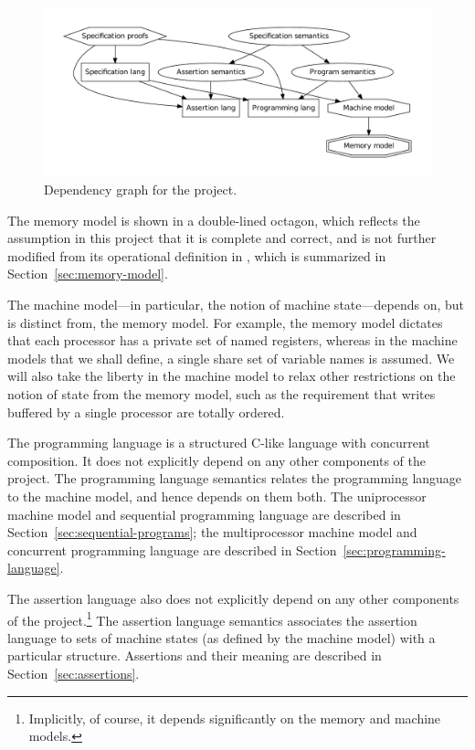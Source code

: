 \documentclass[11pt]{report}
\begin{document}
\begin{figure}[ht]
\includegraphics[scale=0.5]{dependency-graph/dg-reduced}
\caption{\label{fig:dependency-graph}Dependency graph for the project.}
\end{figure}

The memory model is shown in a double-lined octagon, which reflects the assumption in this project that it is complete and correct, and is not further modified from its operational definition in \cite{DBLP:conf/tphol/OwensSS09}, which is summarized in Section~\ref{sec:memory-model}. 

The machine model---in particular, the notion of machine state---depends on, but is distinct from, the memory model. For example, the memory model dictates that each processor has a private set of named registers, whereas in the machine models that we shall define, a single share set of variable names is assumed. We will also take the liberty in the machine model to relax other restrictions on the notion of state from the memory model, such as the requirement that writes buffered by a single processor are totally ordered. 

The programming language is a structured C-like language with concurrent composition. It does not explicitly depend on any other components of the project. The programming language semantics relates the programming language to the machine model, and hence depends on them both. The uniprocessor machine model and sequential programming language are described in Section~\ref{sec:sequential-programs}; the multiprocessor machine model and concurrent programming language are described in Section~\ref{sec:programming-language}. 

The assertion language also does not explicitly depend on any other components of the project.\footnote{Implicitly, of course, it depends significantly on the memory and machine models.} The assertion language semantics associates the assertion language to sets of machine states (as defined by the machine model) with a particular structure. Assertions and their meaning are described in Section~\ref{sec:assertions}. 
\end{document}
